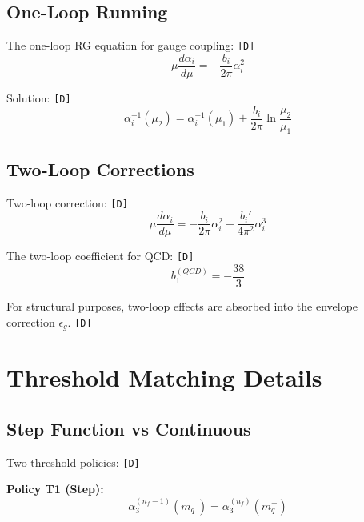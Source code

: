 \documentclass[11pt,a4paper]{article}
\newcommand{\tagD}{\textcolor{green!50!black}{\texttt{[D]}}}
\theoremstyle{definition}
\begin{document}
\subsection{One-Loop Running}
\label{app:one-loop}

The one-loop RG equation for gauge coupling: \tagD{}
\begin{equation}
\label{eq:app-rg-1}
\mu \frac{d\alpha_i}{d\mu} = -\frac{b_i}{2\pi} \alpha_i^2
\end{equation}

Solution: \tagD{}
\begin{equation}
\label{eq:app-rg-2}
\alpha_i^{-1}(\mu_2) = \alpha_i^{-1}(\mu_1) + \frac{b_i}{2\pi} \ln\frac{\mu_2}{\mu_1}
\end{equation}

\subsection{Two-Loop Corrections}
\label{app:two-loop}

Two-loop correction: \tagD{}
\begin{equation}
\label{eq:app-rg-3}
\mu \frac{d\alpha_i}{d\mu} = -\frac{b_i}{2\pi} \alpha_i^2 - \frac{b_i'}{4\pi^2} \alpha_i^3
\end{equation}

The two-loop coefficient for QCD: \tagD{}
\begin{equation}
\label{eq:app-b1-qcd}
b_1^{(QCD)} = -\frac{38}{3}
\end{equation}

For structural purposes, two-loop effects are absorbed into the envelope
correction $\epsilon_g$. \tagD{}

\section{Threshold Matching Details}
\label{app:threshold}

\subsection{Step Function vs Continuous}
\label{app:step-vs-cont}

Two threshold policies: \tagD{}

\textbf{Policy T1 (Step):}
\begin{equation}
\label{eq:app-t1-step}
\alpha_3^{(n_f-1)}(m_q^-) = \alpha_3^{(n_f)}(m_q^+)
\end{equation}
\end{document}

